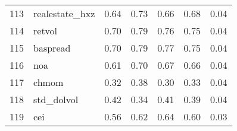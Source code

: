 \documentclass[12pt]{article}
\begin{document}
\begin{footnotesize}
\begin{longtable}{rl|c|c|c|c|c}
113 & realestate\_hxz  & 0.64                                                                                      & 0.73                                                                                        & 0.66                                                                                         & 0.68 & 0.04               \\
114 & retvol           & 0.70                                                                                      & 0.79                                                                                        & 0.76                                                                                         & 0.75 & 0.04               \\
115 & baspread         & 0.70                                                                                      & 0.79                                                                                        & 0.77                                                                                         & 0.75 & 0.04               \\
116 & noa              & 0.61                                                                                      & 0.70                                                                                        & 0.67                                                                                         & 0.66 & 0.04               \\
117 & chmom            & 0.32                                                                                      & 0.38                                                                                        & 0.30                                                                                         & 0.33 & 0.04               \\
118 & std\_dolvol      & 0.42                                                                                      & 0.34                                                                                        & 0.41                                                                                         & 0.39 & 0.04               \\
119 & cei              & 0.56                                                                                      & 0.62                                                                                        & 0.64                                                                                         & 0.60 & 0.03               \\

\end{longtable}
\end{footnotesize}
\end{document}
